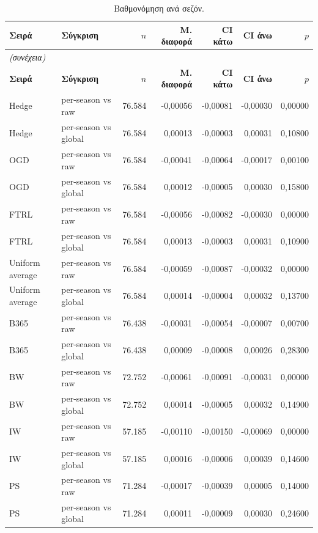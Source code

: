 {\footnotesize
\begin{longtable}{@{}llrrrrr@{}}
\caption{Βαθμονόμηση ανά σεζόν.}\label{app:calseason}\\
\toprule \textbf{Σειρά} & \textbf{Σύγκριση} & \textbf{$n$} & \textbf{Μ. διαφορά} & \textbf{CI κάτω} & \textbf{CI άνω} & \textbf{$p$} \\\midrule\endfirsthead
\multicolumn{7}{l}{\emph{(συνέχεια)}}\\\toprule \textbf{Σειρά} & \textbf{Σύγκριση} & \textbf{$n$} & \textbf{Μ. διαφορά} & \textbf{CI κάτω} & \textbf{CI άνω} & \textbf{$p$} \\\midrule\endhead
\bottomrule\endfoot
Hedge & per-season vs raw & 76.584 & -0,00056 & -0,00081 & -0,00030 & 0,00000 \\
Hedge & per-season vs global & 76.584 & 0,00013 & -0,00003 & 0,00031 & 0,10800 \\
OGD & per-season vs raw & 76.584 & -0,00041 & -0,00064 & -0,00017 & 0,00100 \\
OGD & per-season vs global & 76.584 & 0,00012 & -0,00005 & 0,00030 & 0,15800 \\
FTRL & per-season vs raw & 76.584 & -0,00056 & -0,00082 & -0,00030 & 0,00000 \\
FTRL & per-season vs global & 76.584 & 0,00013 & -0,00003 & 0,00031 & 0,10900 \\
Uniform average & per-season vs raw & 76.584 & -0,00059 & -0,00087 & -0,00032 & 0,00000 \\
Uniform average & per-season vs global & 76.584 & 0,00014 & -0,00004 & 0,00032 & 0,13700 \\
B365 & per-season vs raw & 76.438 & -0,00031 & -0,00054 & -0,00007 & 0,00700 \\
B365 & per-season vs global & 76.438 & 0,00009 & -0,00008 & 0,00026 & 0,28300 \\
BW & per-season vs raw & 72.752 & -0,00061 & -0,00091 & -0,00031 & 0,00000 \\
BW & per-season vs global & 72.752 & 0,00014 & -0,00005 & 0,00032 & 0,14900 \\
IW & per-season vs raw & 57.185 & -0,00110 & -0,00150 & -0,00069 & 0,00000 \\
IW & per-season vs global & 57.185 & 0,00016 & -0,00006 & 0,00039 & 0,14600 \\
PS & per-season vs raw & 71.284 & -0,00017 & -0,00039 & 0,00005 & 0,14000 \\
PS & per-season vs global & 71.284 & 0,00011 & -0,00009 & 0,00030 & 0,24600 \\

\end{longtable}}
